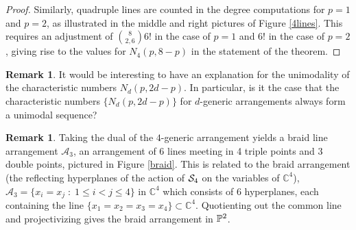 \documentclass[12pt]{article}
\theoremstyle{plain}
\theoremstyle{definition}
\newtheorem{remark}[theorem]{Remark}
\newcommand{\A}{\mathcal{A}}
\newcommand{\C}{\mathbb{C}}
\renewcommand{\P}{\ensuremath \mathbb{P}}
\renewcommand{\S}{\ensuremath \mathcal{S}}
\begin{document}
\begin{proof}
Similarly, quadruple lines are counted in the degree
computations for $p=1$ and $p=2$, as illustrated in the middle and
right pictures of Figure \ref{4lines}. This requires an adjustment of
$\binom{8}{2,6}6!$ in the case of $p=1$ and $6!$ in the case of
$p=2$, giving rise to the values for $N_4(p,8-p)$ in the statement of the theorem. 
\end{proof} 

\begin{remark} It would be interesting to have an explanation for the unimodality of
the characteristic numbers $N_d(p,2d-p)$. In
particular, is it the case that the characteristic numbers
$\{ N_d(p,2d-p)\}$ for
$d$-generic arrangements always form a unimodal sequence? 
\end{remark}

\begin{remark} \label{braidr}
Taking the dual of the $4$-generic arrangement yields a braid line
arrangement $\mathcal{A}_3$, an arrangement of $6$ lines meeting in 4 triple points
and 3 double points, pictured in Figure \ref{braid}. This is related
to the braid arrangement (the reflecting hyperplanes of the
action of $\S_4$ on the variables of $\C^4$), $\A_3 = \{x_i = x_j \; : \; 1 \leq i
< j \leq 4\}$ in $\C^4$ which consists of 6 hyperplanes, each
containing the line $\{x_1=x_2=x_3=x_4\} \subset \C^4$. Quotienting
out the common line and projectivizing gives the braid arrangement in $\P^2$. 



\end{remark}
\end{document}

